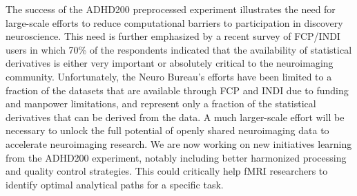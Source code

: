 \documentclass[preprint,12pt,1p]{elsarticle}
\begin{document}
\par 
The success of the ADHD200 preprocessed experiment illustrates the need for large-scale efforts to reduce computational barriers to participation in discovery neuroscience. This need is further emphasized by a recent survey of FCP/INDI users in which 70\% of the respondents indicated that the availability of statistical derivatives is either very important or absolutely critical to the neuroimaging community. Unfortunately, the Neuro Bureau’s efforts have been limited to a fraction of the datasets that are available through FCP and INDI due to funding and manpower limitations, and represent only a fraction of the statistical derivatives that can be derived from the data. A much larger-scale effort will be necessary to unlock the full potential of openly shared neuroimaging data to accelerate neuroimaging research. We are now working on new initiatives learning from the ADHD200 experiment, notably including better harmonized processing and quality control strategies. This could critically help fMRI researchers to identify optimal analytical paths for a specific task. 





% 
% 
% 
% 
% 
% 
% 
% 
% 
% 
% 
% 


\end{document}
